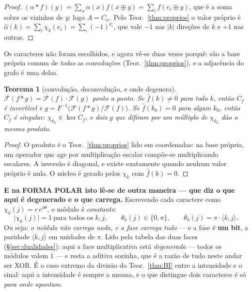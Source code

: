 \documentclass[11pt,a4paper]{article}
\newtheorem{teorema}{Teorema}
\begin{document}
\begin{proof}
$(\alpha*f)(y)=\sum_x\alpha(x)f(x\oplus y)=\sum_i f(e_i\oplus y)$, que é a soma
sobre os vizinhos de $y$: logo $A=C_\alpha$. Pelo Teor.~\ref{thm:proprios} o
valor próprio é $\widehat{\alpha}(k)=\sum_i\chi_k(e_i)=\sum_i(-1)^{k_i}$, que
vale $-1$ nas $\lvert k\rvert$ direções de $k$ e $+1$ nas outras.
\end{proof}

\medskip\noindent Os caracteres não foram escolhidos, e agora vê-se duas vezes
porquê: são a base própria comum de \emph{todas} as convoluções
(Teor.~\ref{thm:proprios}), e a adjacência do grafo é uma delas.

\begin{teorema}[convolução, deconvolução, e onde degenera]\label{thm:conv}
$\mathcal{F}(f*g)=\mathcal{F}(f)\cdot \mathcal{F}(g)$ ponto a ponto. Se $\widehat{f}(k)\neq0$ para todo $k$,
então $C_f$ é invertível e
$g=F^{-1}\bigl(\mathcal{F}(f*g)/\mathcal{F}(f)\bigr)$. Se $\widehat{f}(k_0)=0$ para algum $k_0$,
então $C_f$ é singular: $\chi_{k_0}\in\ker C_f$, e dois $g$ que difiram por um
múltiplo de $\chi_{k_0}$ dão o mesmo produto.
\end{teorema}

\begin{proof}
O produto é o Teor.~\ref{thm:proprios} lido em coordenadas: na base própria, um
operador que age por multiplicação escalar compõe-se multiplicando escalares. A
inversão é diagonal, e existe exatamente quando nenhum valor próprio é nulo. O
núcleo é gerado pelos $\chi_k$ com $\widehat{f}(k)=0$.
\end{proof}

\medskip\noindent\textbf{E na FORMA POLAR isto lê-se de outra maneira --- que
diz o que aqui é degenerado e o que carrega.} Escrevendo cada caractere como
$\chi_k(j)=r\,e^{\partial\theta}$, o módulo é \emph{constante}:
\[
\lvert\chi_k(j)\rvert=1\ \text{para todos os }k,j,
\qquad
\theta_k(j)\in\{0,\pi\},\qquad
\theta_k(j)=\pi\cdot\langle k,j\rangle .
\]
Ou seja: \emph{o módulo não carrega nada, e a fase carrega tudo} --- e a fase é
\textbf{um bit}, a paridade $\langle k,j\rangle$ em unidades de $\pi$. Lido pela
tabela das duas faces (§\ref{sec:dualidades}): aqui a face multiplicativa está
\emph{degenerada} --- todos os módulos valem $1$ --- e resta a aditiva sozinha,
que é a razão de tudo neste andar ser XOR. É o caso
extremo da divisão do Teor.~\ref{thm:BI} entre a intensidade e o sinal: aqui a
intensidade é sempre a mesma, e o que distingue dois caracteres é só \emph{para
onde apontam}.
\end{document}
